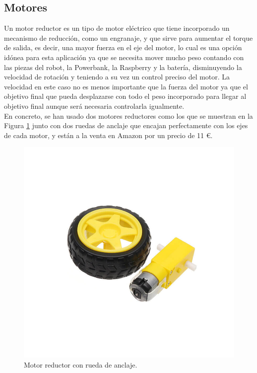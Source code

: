 \vspace{2cm}

\subsection{Motores}
\label{subsec:motores}

Un motor reductor es un tipo de motor eléctrico que tiene incorporado un mecanismo de reducción, como un engranaje, y que sirve para aumentar el torque de salida, es decir, una mayor fuerza en el eje del motor, lo cual es una opción idónea para esta aplicación ya que se necesita mover mucho peso contando con las piezas del robot, la Powerbank, la Raspberry y la batería, disminuyendo la velocidad de rotación y teniendo a su vez un control preciso del motor. La velocidad en este caso no es menos importante que la fuerza del motor ya que el objetivo final que pueda desplazarse con todo el peso incorporado para llegar al objetivo final aunque será necesaria controlarla igualmente. \\

En concreto, se han usado dos motores reductores como los que se muestran en la Figura \ref{fig:Motor} junto con dos ruedas de anclaje que encajan perfectamente con los ejes de cada motor, y están a la venta en Amazon por un precio de 11 \euro. 

\begin{figure}[H]
  \centering
  \includegraphics[scale=0.35]{figs/motor} %
  \caption{Motor reductor con rueda de anclaje.}
  \label{fig:Motor}
\end{figure}

